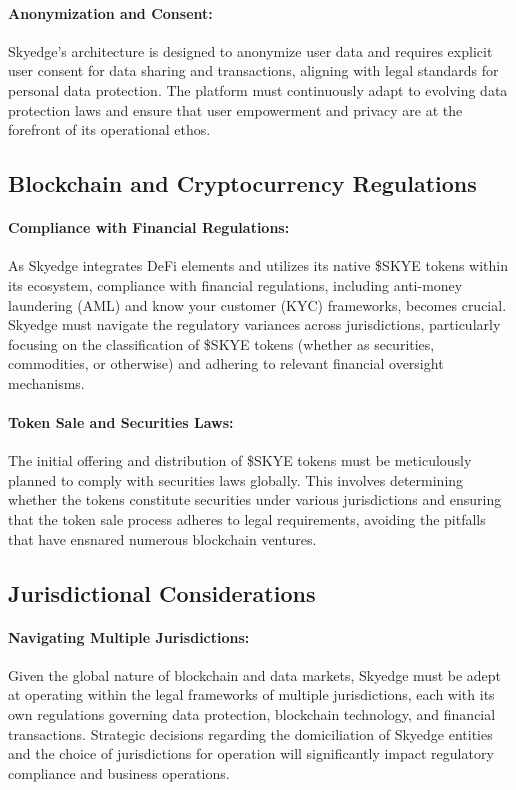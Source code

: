 \documentclass{article}
\begin{document}
\paragraph{Anonymization and Consent:} Skyedge's architecture is designed to anonymize user data and requires explicit user consent for data sharing and transactions, aligning with legal standards for personal data protection. The platform must continuously adapt to evolving data protection laws and ensure that user empowerment and privacy are at the forefront of its operational ethos.

\subsection{Blockchain and Cryptocurrency Regulations}

\paragraph{Compliance with Financial Regulations:} As Skyedge integrates DeFi elements and utilizes its native \$SKYE tokens within its ecosystem, compliance with financial regulations, including anti-money laundering (AML) and know your customer (KYC) frameworks, becomes crucial. Skyedge must navigate the regulatory variances across jurisdictions, particularly focusing on the classification of \$SKYE tokens (whether as securities, commodities, or otherwise) and adhering to relevant financial oversight mechanisms.

\paragraph{Token Sale and Securities Laws:} The initial offering and distribution of \$SKYE tokens must be meticulously planned to comply with securities laws globally. This involves determining whether the tokens constitute securities under various jurisdictions and ensuring that the token sale process adheres to legal requirements, avoiding the pitfalls that have ensnared numerous blockchain ventures.

\subsection{Jurisdictional Considerations}

\paragraph{Navigating Multiple Jurisdictions:} Given the global nature of blockchain and data markets, Skyedge must be adept at operating within the legal frameworks of multiple jurisdictions, each with its own regulations governing data protection, blockchain technology, and financial transactions. Strategic decisions regarding the domiciliation of Skyedge entities and the choice of jurisdictions for operation will significantly impact regulatory compliance and business operations.
\end{document}
